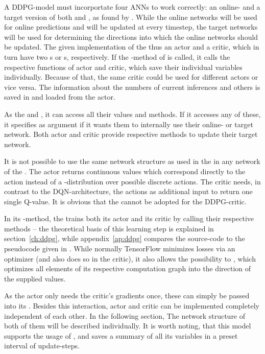 A DDPG-model must incorportate four ANNs to work correctly: an online- and a target version of both  and , as found by \cite{lillicrap_continuous_2015}.  While the online networks will be used for online predictions and will be updated at every timestep, the target networks will be used for determining the directions into which the online networks should be updated. The given implementation of the  thus  an actor and a critic, which in turn have two s or s, respectively. If the -method of  is called, it calls the respective functions of actor and critic, which save their individual variables individually. Because of that, the same critic could be used for different actors or vice versa. The information about the numbers of current inferences and others is saved in and loaded from the actor.

As the    and , it can access all their values and methods. If it accesses any of these, it specifies as argument if it wants them to internally use their online- or target network. Both actor and critic provide respective methods to update their target network.

It is not possible to use the same network structure as used in the  in any network of the . The actor returns continuous values which correspond directly to the action instead of a -distribution over possible discrete actions. The critic needs, in contrast to the DQN-architecture, the actions as additional input to return one single Q-value. It is obvious that the  cannot be adopted for the DDPG-critic.

In its -method, the  trains both its actor and its critic by calling their respective methods -- the theoretical basis of this learning step is explained in section~\ref{ch:ddpg}, while appendix~\ref{ap:ddpg} compares the source-code to the pseudocode given in \cite{lillicrap_continuous_2015}. While normally TensorFlow minimizes losses via an optimizer (and also does so in the critic), it also allows the possibility to , which optimizes all elements of its respective computation graph into the direction of the supplied values. 

As the actor only needs the critic's gradients once, these can simply be passed into its . Besides this interaction, actor and critic can be implemented completely independent of each other. In the following section, The network structure of both of them will be described individually. It is worth noting, that this model supports the usage of , and saves a summary of all its variables in a preset interval of update-steps.

